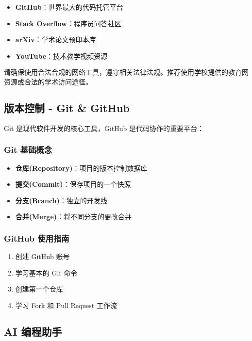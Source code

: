 \documentclass[a4paper,12pt]{article}
\begin{document}
\begin{itemize}
    \item \textbf{GitHub}：世界最大的代码托管平台
    \item \textbf{Stack Overflow}：程序员问答社区
    \item \textbf{arXiv}：学术论文预印本库
    \item \textbf{YouTube}：技术教学视频资源
\end{itemize}

\begin{warningbox}
请确保使用合法合规的网络工具，遵守相关法律法规。推荐使用学校提供的教育网资源或合法的学术访问途径。
\end{warningbox}

\subsection{版本控制 - Git \& GitHub}

Git 是现代软件开发的核心工具，GitHub 是代码协作的重要平台：

\subsubsection{Git 基础概念}
\begin{itemize}
    \item \textbf{仓库(Repository)}：项目的版本控制数据库
    \item \textbf{提交(Commit)}：保存项目的一个快照
    \item \textbf{分支(Branch)}：独立的开发线
    \item \textbf{合并(Merge)}：将不同分支的更改合并
\end{itemize}

\subsubsection{GitHub 使用指南}
\begin{enumerate}
    \item 创建 GitHub 账号
    \item 学习基本的 Git 命令
    \item 创建第一个仓库
    \item 学习 Fork 和 Pull Request 工作流
\end{enumerate}

\subsection{AI 编程助手}
\end{document}

